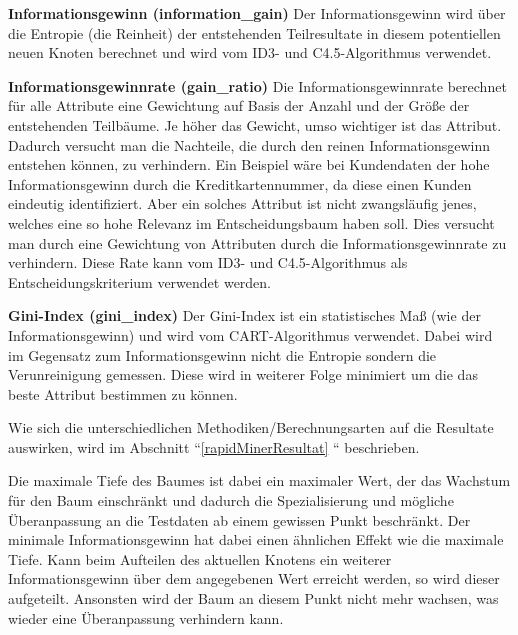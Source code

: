 \begin{pitemize}
\item \textbf{Informationsgewinn (information\_gain)} Der Informationsgewinn wird über die Entropie (die Reinheit) der entstehenden Teilresultate in diesem potentiellen neuen Knoten berechnet und wird vom ID3- und C4.5-Algorithmus verwendet.
\item \textbf{Informationsgewinnrate (gain\_ratio)} Die Informationsgewinnrate berechnet für alle Attribute eine Gewichtung auf Basis der Anzahl und der Größe der entstehenden Teilbäume. Je höher das Gewicht, umso wichtiger ist das Attribut. Dadurch versucht man die Nachteile, die durch den reinen Informationsgewinn entstehen können, zu verhindern. Ein Beispiel wäre bei Kundendaten der hohe Informationsgewinn durch die Kreditkartennummer, da diese einen Kunden eindeutig identifiziert. Aber ein solches Attribut ist nicht zwangsläufig jenes, welches eine so hohe Relevanz im Entscheidungsbaum haben soll. Dies versucht man durch eine Gewichtung von Attributen durch die Informationsgewinnrate zu verhindern. Diese Rate kann vom ID3- und C4.5-Algorithmus als Entscheidungskriterium verwendet werden. \cite{rapidminer_rapidminer_2015} \cite{johannes_furnkranz_decision-tree_2008} 
\item \textbf{Gini-Index (gini\_index)} Der Gini-Index ist ein statistisches Maß (wie der Informationsgewinn) und wird vom CART-Algorithmus verwendet. Dabei wird im Gegensatz zum Informationsgewinn nicht die Entropie sondern die Verunreinigung gemessen. Diese wird in weiterer Folge minimiert um die das beste Attribut bestimmen zu können. \cite{johannes_furnkranz_decision-tree_2008}
\end{pitemize}

Wie sich die unterschiedlichen Methodiken/Berechnungsarten auf die Resultate auswirken, wird im Abschnitt ``\ref{rapidMinerResultat} `` beschrieben.

Die maximale Tiefe des Baumes ist dabei ein maximaler Wert, der das Wachstum für den Baum einschränkt und dadurch die Spezialisierung und mögliche Überanpassung an die Testdaten ab einem gewissen Punkt beschränkt. Der minimale Informationsgewinn hat dabei einen ähnlichen Effekt wie die maximale Tiefe. Kann beim Aufteilen des aktuellen Knotens ein weiterer Informationsgewinn über dem angegebenen Wert erreicht werden, so wird dieser aufgeteilt. Ansonsten wird der Baum an diesem Punkt nicht mehr wachsen, was wieder eine Überanpassung verhindern kann. \cite{rapidminer_rapidminer_2015}

